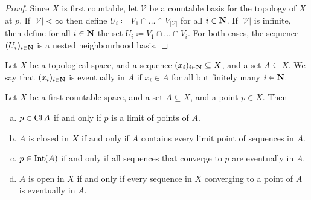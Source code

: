 \begin{proof}
Since \(X\) is first countable, let \(\mathcal V\) be a countable basis for the
topology of \(X\) at \(p\). If \(|\mathcal V| < \infty\) then define \(U_i \coloneq
V_1 \cap \dots \cap V_{|\mathcal V|}\) for all \(i \in \mathbf{N}\). If
\(|\mathcal V|\) is infinite, then define for all \(i \in \mathbf{N}\) the
set \(U_i \coloneq V_1 \cap \dots \cap V_i\). For both cases, the sequence
\((U_i)_{i \in \mathbf{N}}\) is a nested neighbourhood basis.
\end{proof}

\begin{definition}[Eventually in]
Let \(X\) be a topological space, and a sequence \((x_i)_{i \in \mathbf{N}}
\subseteq X\), and a set \(A \subseteq X\). We say that \((x_i)_{i \in
\mathbf{N}}\) is eventually in \(A\) if \(x_i \in A\) for all but finitely
many \(i \in \mathbf{N}\).
\end{definition}

\begin{lemma}\label{lem: sequence lemma}
Let \(X\) be a first countable space, and a set \(A \subseteq X\), and a point
\(p \in X\). Then
\begin{enumerate}[(a)]
  \item \(p \in \operatorname{Cl} A\) if and only if \(p\) is a limit of points of
    \(A\).
  \item \(A\) is closed in \(X\) if and only if \(A\) contains every limit
    point of sequences in \(A\).
  \item \(p \in \operatorname{Int}(A)\) if and only if all sequences that converge to
    \(p\) are eventually in \(A\).
  \item \(A\) is open in \(X\) if and only if every sequence in \(X\)
    converging to a point of \(A\) is eventually in \(A\).
\end{enumerate}
\end{lemma}

